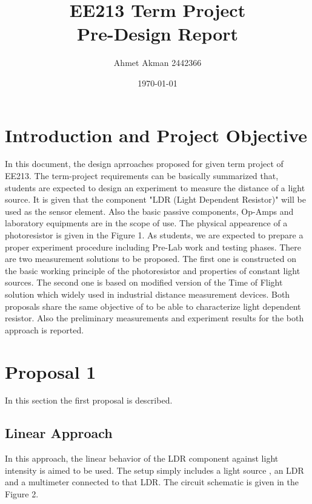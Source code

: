 \documentclass[letterpaper,12pt]{article}
\begin{document}
\title{EE213 Term Project \protect\\Pre-Design Report}
\author{Ahmet Akman 2442366}
\date{\today}
\maketitle
\newpage

\tableofcontents
\newpage


\section{Introduction and Project Objective}
In this document, the design aprroaches proposed for given term project of EE213. The term-project requirements can be basically summarized that, students are expected to design an experiment to measure the distance of a light source. It is given that the component "LDR (Light Dependent Resistor)" will be used as the sensor element. Also the basic passive components, Op-Amps and laboratory equipments are in the scope of use. The physical appearence of a photoresistor is given in the Figure 1. 
As students, we are expected to prepare a proper experiment procedure including Pre-Lab work and testing phases. 
There are two measurement solutions to be proposed. The first one is constructed on the basic working principle of the photoresistor and properties of constant light sources. The second one is based on modified version of the Time of Flight solution which widely used in industrial distance measurement devices. Both proposals share the same objective of to be able to characterize light dependent resistor. Also the preliminary measurements and experiment results for the both approach is reported.


\section{Proposal 1}
In this section the first proposal is described.
\subsection{Linear Approach}
In this approach, the linear behavior of the LDR component against light intensity is aimed to be used. The setup simply includes a light source , an LDR and a multimeter connected to that LDR. The circuit schematic is given in the Figure 2.
\end{document}
